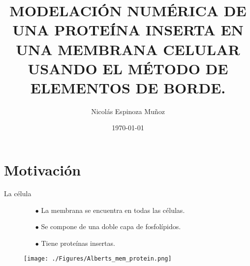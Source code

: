 \documentclass[usenames,dvipsnames,landscape]{beamer}
\author{Nicolás Espinoza Muñoz}
\title{MODELACIÓN NUMÉRICA DE UNA PROTEÍNA INSERTA EN UNA MEMBRANA CELULAR USANDO EL MÉTODO DE ELEMENTOS DE BORDE.}
\institute{UNIVERSIDAD TÉCNICA FEDERICO SANTA MARÍA}
\date{\today}
\begin{document}
	
	\maketitle
	
	\section{Motivación}
	
\begin{frame}{La célula}
	\begin{figure}
		\begin{minipage}{0.5\slidewidth}
			\begin{itemize}
				\item[$\bullet$] La membrana se encuentra en todas las células.
				\item[$\bullet$] Se compone de una doble capa de fosfolípidos.
				\item[$\bullet$] Tiene proteínas insertas.
			\end{itemize}
		\end{minipage}
	\vspace{15pt}
		\begin{minipage}{0.1\slidewidth}
			\hspace*{0.5cm}
		\end{minipage}%
		\begin{minipage}{0.2\slidewidth}
			\texttt{[image: ./Figures/Alberts\_mem\_protein.png]}
		\end{minipage}
	\vspace{-50pt}
		\begin{minipage}{0.45\slidewidth}
			
		\end{minipage}
	\end{figure}
\end{frame}
\end{document}
